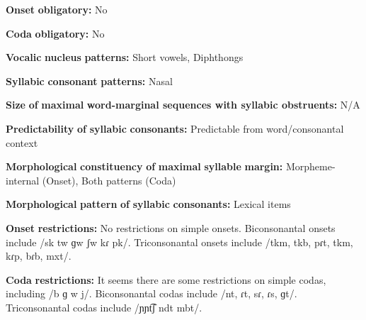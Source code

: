 \documentclass[output=paper]{langsci/langscibook}
\begin{document}
\begin{styleBody}
\textbf{Onset} \textbf{obligatory:} No
\end{styleBody}

\begin{styleBody}
\textbf{Coda} \textbf{obligatory:} No
\end{styleBody}

\begin{styleBody}
\textbf{Vocalic} \textbf{nucleus} \textbf{patterns:} Short vowels, Diphthongs
\end{styleBody}

\begin{styleBody}
\textbf{Syllabic} \textbf{consonant} \textbf{patterns:} Nasal
\end{styleBody}

\begin{styleBody}
\textbf{Size} \textbf{of} \textbf{maximal} \textbf{word{}-marginal sequences with syllabic obstruents:} N/A
\end{styleBody}

\begin{styleBody}
\textbf{Predictability} \textbf{of} \textbf{syllabic} \textbf{consonants:} Predictable from word/consonantal context
\end{styleBody}

\begin{styleBody}
\textbf{Morphological} \textbf{constituency} \textbf{of} \textbf{maximal} \textbf{syllable} \textbf{margin:} Morpheme-internal (Onset), Both patterns (Coda)
\end{styleBody}

\begin{styleBody}
\textbf{Morphological} \textbf{pattern} \textbf{of} \textbf{syllabic} \textbf{consonants:} Lexical items
\end{styleBody}

\begin{styleBody}
\textbf{Onset} \textbf{restrictions:} No restrictions on simple onsets. Biconsonantal onsets include /sk tw ɡw ʃw kɾ pk/. Triconsonantal onsets include /tkm, tkb, pɾt, tkm, kɾp, bɾb, mxt/.
\end{styleBody}

\begin{styleBody}
\textbf{Coda} \textbf{restrictions:} It seems there are some restrictions on simple codas, including /b ɡ w j/. Biconsonantal codas include /nt, ɾt, sɾ, ɾs, ɡt/. Triconsonantal codas include /ɲɲt͡ʃ ndt mbt/.
\end{styleBody}
\end{document}
